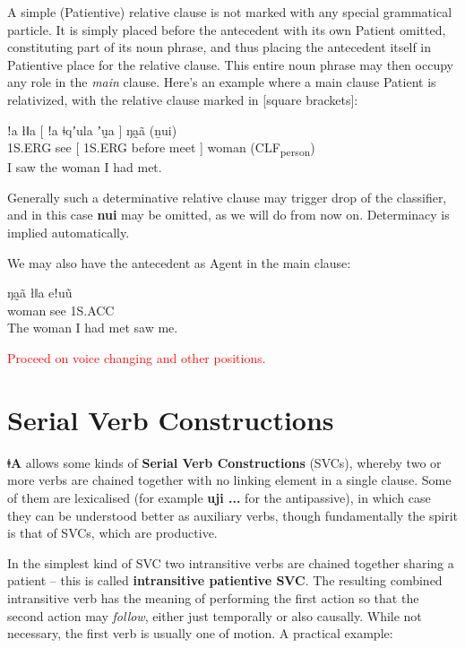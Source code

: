 \documentclass[11pt,a5paper]{book}
\newcommand{\qcn}[1]{\textcolor{AccentText}{\large\textbf{#1}}}
\newcommand{\langname}{\qcn{ǂA}}
\newcommand{\grammsc}[1]{\textsc{#1}}
\newcommand{\CLF}[1]{\grammsc{CLF}\textsubscript{#1}}
\newcommand{\ERG}{\grammsc{ERG}}
\newcommand{\ACC}{\grammsc{ACC}}
\newcommand{\cmnt}[1]{\textcolor{red}{#1}}
\begin{document}
A simple (Patientive) relative clause is not marked with any special grammatical particle. It is simply placed before the antecedent with its own Patient omitted, constituting part of its noun phrase, and thus placing the antecedent itself in Patientive place for the relative clause. This entire noun phrase may then occupy any role in the \emph{main} clause. Here's an example where a main clause Patient is relativized, with the relative clause marked in [square brackets]:

\begin{exe}
\ex
\gll ǃa łǁa [ ǃa ǂqʼula ʼṵa ] ŋa̰ã (ṉui) \\
1S.\ERG{} see [ 1S.\ERG{} before meet ] woman (\CLF{person}) \\
\glt I saw the woman I had met.
\end{exe}

Generally such a determinative relative clause may trigger drop of the classifier, and in this case \qcn{nui} may be omitted, as we will do from now on. Determinacy is implied automatically.

We may also have the antecedent as Agent in the main clause:

\begin{exe}
\ex
{} ŋa̰ã łǁa eǃuũ \\
[ 1S.\ERG{} before meet ] woman see 1S.\ACC{} \\
\glt The woman I had met saw me.
\end{exe}

\cmnt{Proceed on voice changing and other positions.}

\section{Serial Verb Constructions}

\langname{} allows some kinds of \textbf{Serial Verb Constructions} (SVCs), whereby two or more verbs are chained together with no linking element in a single clause. Some of them are lexicalised (for example \qcn{uji ...} for the antipassive), in which case they can be understood better as auxiliary verbs, though fundamentally the spirit is that of SVCs, which are productive.

In the simplest kind of SVC two intransitive verbs are chained together sharing a patient -- this is called \textbf{intransitive patientive SVC}. The resulting combined intransitive verb has the meaning of performing the first action so that the second action may \emph{follow}, either just temporally or also causally. While not necessary, the first verb is usually one of motion. A practical example:
\end{document}

